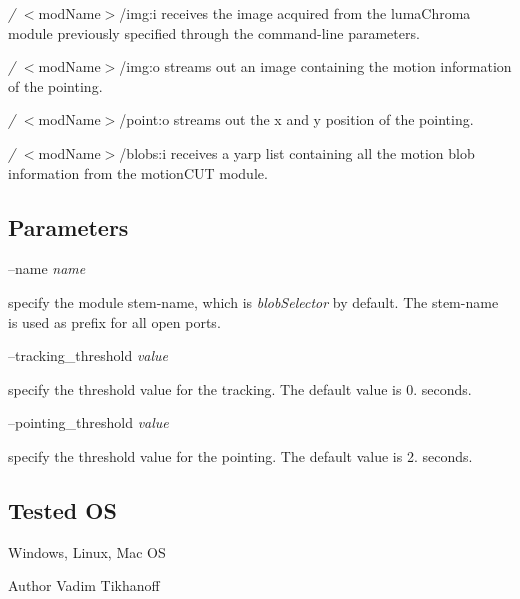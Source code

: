 \begin{DoxyItemize}
\item {\itshape /} $<$mod\+Name$>$/img\+:i receives the image acquired from the luma\+Chroma module previously specified through the command-\/line parameters.
\item {\itshape /} $<$mod\+Name$>$/img\+:o streams out an image containing the motion information of the pointing.
\item {\itshape /} $<$mod\+Name$>$/point\+:o streams out the x and y position of the pointing.
\item {\itshape /} $<$mod\+Name$>$/blobs\+:i receives a yarp list containing all the motion blob information from the motion\+C\+UT module.
\end{DoxyItemize}\hypertarget{group__iolReachingCalibration_parameters_sec}{}\subsection{Parameters}\label{group__iolReachingCalibration_parameters_sec}
--name {\itshape name} 
\begin{DoxyItemize}
\item specify the module stem-\/name, which is {\itshape blob\+Selector} by default. The stem-\/name is used as prefix for all open ports.
\end{DoxyItemize}

--tracking\+\_\+threshold {\itshape value} 
\begin{DoxyItemize}
\item specify the threshold value for the tracking. The default value is 0. seconds.
\end{DoxyItemize}

--pointing\+\_\+threshold {\itshape value} 
\begin{DoxyItemize}
\item specify the threshold value for the pointing. The default value is 2. seconds.
\end{DoxyItemize}\hypertarget{group__icub__iolStateMachineHandler_tested_os_sec}{}\subsection{Tested OS}\label{group__icub__iolStateMachineHandler_tested_os_sec}
Windows, Linux, Mac OS

\begin{DoxyAuthor}{Author}
Vadim Tikhanoff 
\end{DoxyAuthor}
